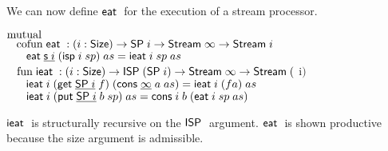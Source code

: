 We can now define $\mathsf{eat}\;$ for the execution of a stream processor.
\begin{bsp}
$\mathrm{mutual}\; $\\
$\hspace*{3mm} \mathrm{cofun}\; \mathsf{eat}\; : (i : \mathsf{Size} ) \rightarrow \mathsf{SP}\; i \rightarrow \mathsf{Stream}\; \infty \rightarrow \mathsf{Stream}\; i$ \\
$\spc \spc \eat \inacc{\s i} \; (\isp i \; sp) \; as = \ieat i \; sp \; as $ \\
$\hspace*{3mm} \mathrm{fun}\; \mathsf{ieat}\; : (i : \mathsf{Size} ) \rightarrow \mathsf{ISP}\; (\mathsf{SP}\; i) \rightarrow \mathsf{Stream}\; \infty \rightarrow \mathsf{Stream}\; ($ i$)$\\
$\spc \spc \ieat i\; (\getd \inacc{\spd i} \; f) \; (\cons \inacc{\infty} \; a \; as) = \ieat i \; (f a) \; as$\\
$\spc \spc \ieat i\; (\putd \inacc{\spd i} \; b \; sp) \; as  = \cons i \; b \; (\eat i \; sp \; as) $\\
\end{bsp}
$\mathsf{ieat}\;$ is structurally recursive on the $\mathsf{ISP}\;$ argument.
$\mathsf{eat}\;$ is shown productive because the size argument is admissible.
